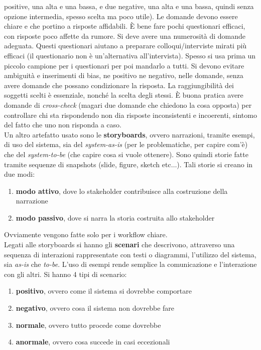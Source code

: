 \documentclass[a4paper,12pt, oneside]{book}
\begin{document}
positive, una alta e una bassa, e due negative, una alta e una bassa, quindi
senza opzione intermedia, spesso scelta ma poco utile). Le
domande devono essere chiare e che portino a risposte affidabili. È bene fare
pochi questionari efficaci, con risposte poco affette da rumore. Si deve avere
una numerosità di domande adeguata. Questi questionari aiutano a preparare
colloqui/interviste mirati più efficaci (il questionario non è un'alternativa
all'intervista). Spesso si usa prima un piccolo campione 
per i questionari per poi mandarlo a tutti. Si devono evitare ambiguità e
inserimenti di bias, ne positivo ne negativo, nelle domande, senza avere domande
che possano condizionare la risposta. La raggiungibilità dei soggetti scelti è
essenziale, nonché la scelta degli stessi. È buona pratica avere domande di
\textit{cross-check} (magari due domande che chiedono la cosa opposta) per
controllare chi sta rispondendo non dia risposte 
inconsistenti e incoerenti, sintomo del fatto che uno non risponda a caso.\\
Un altro artefatto usato sono le \textbf{storyboards}, ovvero narrazioni,
tramite esempi, di uso del sistema, sia del \textit{system-as-is} (per le
problematiche, per capire com'è) che del \textit{system-to-be} (che capire cosa
si vuole ottenere). Sono quindi storie fatte tramite
sequenze di snapshots (slide, figure, sketch etc$\ldots$). Tali storie si creano
in due modi:
\begin{enumerate}
  \item \textbf{modo attivo}, dove lo stakeholder contribuisce alla costruzione
  della narrazione
  \item \textbf{modo passivo}, dove si narra la storia costruita allo stakeholder
\end{enumerate}
Ovviamente vengono fatte solo per i workflow chiare.\\
Legati alle storyboards si hanno gli \textbf{scenari} che descrivono, attraverso
una sequenza di interazioni rappresentate con testi o diagrammi, l'utilizzo del
sistema, sia \textit{as-is} che \textit{to-be}. L'uso di esempi rende semplice
la comunicazione e l'interazione con gli altri. Si hanno 4 tipi di scenario:
\begin{enumerate}
  \item \textbf{positivo}, ovvero come il sistema si dovrebbe comportare
  \item \textbf{negativo}, ovvero cosa il sistema non dovrebbe fare
  \item \textbf{normale}, ovvero tutto procede come dovrebbe
  \item \textbf{anormale}, ovvero cosa succede in casi eccezionali
\end{enumerate}
\end{document}
